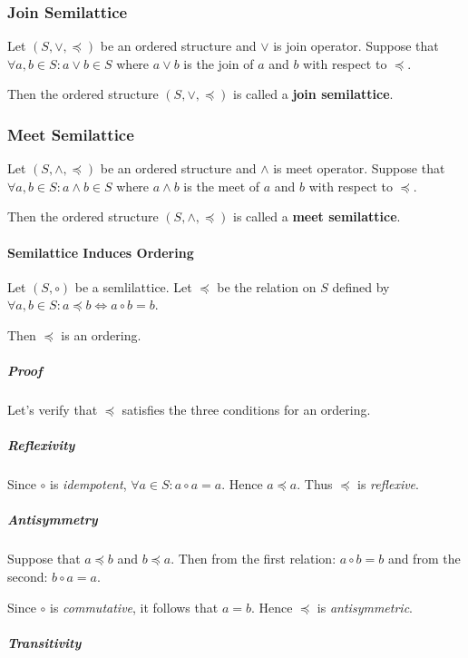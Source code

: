 \subsubsection{Join Semilattice}

Let $(S, \vee, \preceq)$ be an ordered structure and $\vee$ is join
operator. Suppose that $\forall a, b \in S: a \vee b \in S$ where
$a \vee b$ is the join of $a$ and $b$ with respect to $\preceq$.

Then the ordered structure $(S, \vee, \preceq)$ is called a
\textbf{join semilattice}.


\subsubsection{Meet Semilattice}

Let $(S, \wedge, \preceq)$ be an ordered structure and $\wedge$ is
meet operator. Suppose that $\forall a, b \in S: a \wedge b \in S$
where $a \wedge b$ is the meet of $a$ and $b$ with respect to
$\preceq$.

Then the ordered structure $(S, \wedge, \preceq)$ is called a
\textbf{meet semilattice}.


\paragraph{Semilattice Induces Ordering}
\label{sec:semilattice-induces-ordering}

Let $(S, \circ)$ be a semlilattice. Let $\preceq$ be the relation on
$S$ defined by $\forall a, b \in S: a \preceq b \iff a \circ b = b$.

Then $\preceq$ is an ordering.

\subparagraph{Proof}

Let's verify that $\preceq$ satisfies the three conditions for an
ordering.

\subparagraph{Reflexivity}

Since $\circ$ is \textit{idempotent},
$\forall a \in S: a \circ a = a$. Hence $a \preceq a$. Thus $\preceq$
is \textit{reflexive}.

\subparagraph{Antisymmetry}

Suppose that $a \preceq b$ and $b \preceq a$. Then from the first
relation: $a \circ b = b$ and from the second: $b \circ a =a$.

Since $\circ$ is \textit{commutative}, it follows that $a = b$. Hence
$\preceq$ is \textit{antisymmetric}.

\subparagraph{Transitivity}

